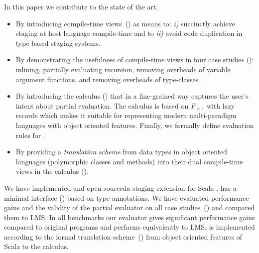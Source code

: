 In this paper we contribute to the state of the art:
\begin{itemize}

 \item By introducing compile-time views~() as means to: \emph{i)} succinctly achieve staging
  at host language compile-time and to \emph{ii)} avoid code duplication in type based
  staging systems.

 \item By demonstrating the usefulness of compile-time views in four case
  studies (): inlining, partially evaluating recursion,
  removing overheads of variable argument functions, and removing overheads of
  type-classes~\cite{wadler1989make,hall_type_1996,oliveira_type_2010}.

 \item By introducing the \calculus calculus () that in a
  fine-grained way captures the user's intent about partial evaluation. The calculus
  is based on $F_{<:}$ with lazy records which makes it suitable for representing
  modern multi-paradigm languages with object oriented features. Finally,
  we formally define evaluation rules for \calculus.

 \item By providing a \emph{translation scheme} from data types in object oriented languages
  (polymorphic classes and methods) into their dual compile-time views in the
  \calculus calculus ().

\end{itemize}

We have implemented and open-sourced\footnotemark[3] a staging extension for Scala \tool.
 \tool has a minimal interface () based on type annotations.
 We have evaluated performance gains and the validity of the partial evaluator on all case
 studies~() and compared them to LMS. In all benchmarks
 our evaluator gives significant performance gains compared to original programs and
 performs equivalently to LMS. \tool is implemented according to the formal translation
 scheme~() from object oriented features of Scala to
 the \calculus calculus.

